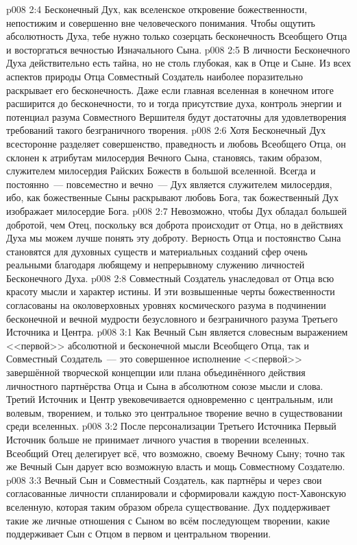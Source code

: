 \vs p008 2:4 \pc Бесконечный Дух, как вселенское откровение божественности, непостижим и совершенно вне человеческого понимания. Чтобы ощутить абсолютность Духа, тебе нужно только созерцать бесконечность Всеобщего Отца и восторгаться вечностью Изначального Сына.
\vs p008 2:5 \pc В личности Бесконечного Духа действительно есть тайна, но не столь глубокая, как в Отце и Сыне. Из всех аспектов природы Отца Совместный Создатель наиболее поразительно раскрывает его бесконечность. Даже если главная вселенная в конечном итоге расширится до бесконечности, то и тогда присутствие духа, контроль энергии и потенциал разума Совместного Вершителя будут достаточны для удовлетворения требований такого безграничного творения.
\vs p008 2:6 Хотя Бесконечный Дух всесторонне разделяет совершенство, праведность и любовь Всеобщего Отца, он склонен к атрибутам милосердия Вечного Сына, становясь, таким образом, служителем милосердия Райских Божеств в большой вселенной. Всегда и постоянно~--- повсеместно и вечно~--- Дух является служителем милосердия, ибо, как божественные Сыны раскрывают любовь Бога, так божественный Дух изображает милосердие Бога.
\vs p008 2:7 Невозможно, чтобы Дух обладал большей добротой, чем Отец, поскольку вся доброта происходит от Отца, но в действиях Духа мы можем лучше понять эту доброту. Верность Отца и постоянство Сына становятся для духовных существ и материальных созданий сфер очень реальными благодаря любящему и непрерывному служению личностей Бесконечного Духа.
\vs p008 2:8 Совместный Создатель унаследовал от Отца всю красоту мысли и характер истины. И эти возвышенные черты божественности согласованы на околоверховных уровнях космического разума в подчинении бесконечной и вечной мудрости безусловного и безграничного разума Третьего Источника и Центра.
\vs p008 3:1 Как Вечный Сын является словесным выражением <<первой>> абсолютной и бесконечной мысли Всеобщего Отца, так и Совместный Создатель~--- это совершенное исполнение <<первой>> завершённой творческой концепции или плана объединённого действия личностного партнёрства Отца и Сына в абсолютном союзе мысли и слова. Третий Источник и Центр увековечивается одновременно с центральным, или волевым, творением, и только это центральное творение вечно в существовании среди вселенных.
\vs p008 3:2 После персонализации Третьего Источника Первый Источник больше не принимает личного участия в творении вселенных. Всеобщий Отец делегирует всё, что возможно, своему Вечному Сыну; точно так же Вечный Сын дарует всю возможную власть и мощь Совместному Создателю.
\vs p008 3:3 Вечный Сын и Совместный Создатель, как партнёры и через свои согласованные личности спланировали и сформировали каждую пост\hyp{}Хавонскую вселенную, которая таким образом обрела существование. Дух поддерживает такие же личные отношения с Сыном во всём последующем творении, какие поддерживает Сын с Отцом в первом и центральном творении.
